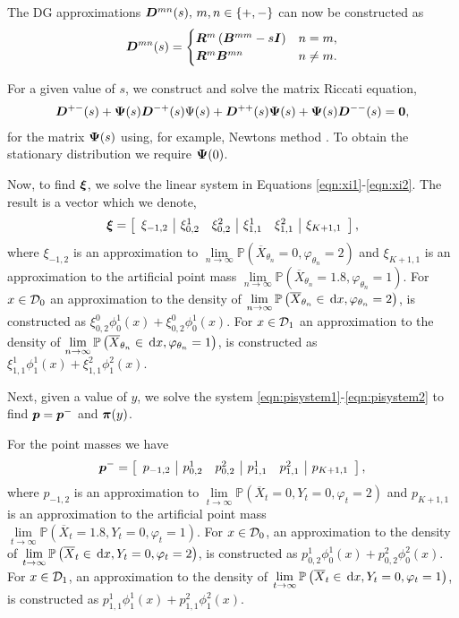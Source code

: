 The DG approximations \(  \boldsymbol D^{m n}(s),\, m,n\in\{+,-\}\) can now be constructed as 
\[  \boldsymbol D^{m n}(s) = \begin{cases}   \boldsymbol R^m\left({  \boldsymbol B}^{mm} - s \boldsymbol I\right) & n=m,
	\\   \boldsymbol R^m {  \boldsymbol B}^{mn} & n \neq m. \end{cases}\]

For a given value of \(s\), we construct and solve the matrix Riccati equation,
\begin{align*}
	\boldsymbol D^{+-}(s)
+ \boldsymbol \Psi(s)   \boldsymbol D^{-+}(s)\Psi(s)
+   \boldsymbol D^{++}(s)\boldsymbol \Psi(s)
+ \boldsymbol \Psi(s)  \boldsymbol D^{--}(s)
= \boldsymbol 0,
\end{align*}
for the matrix \(\boldsymbol \Psi(s)\) using, for example, Newtons method \citep{bot08}. To obtain the stationary distribution we require \(\boldsymbol \Psi(0)\). 

Now, to find \( {\boldsymbol\xi}\), we solve the linear system in Equations \eqref{eqn:xi1}-\eqref{eqn:xi2}. The result is a vector which we denote, 
\[ {\boldsymbol\xi} = \left[\begin{array}{c|cc|cc|c} {\xi}_{-1,2} &  {\xi}_{0,2}^1 &  {\xi}_{0,2}^2 &  {\xi}_{1,1}^1 &  {\xi}_{1,1}^2 &  {\xi}_{K+1,1} \end{array}\right],\]
where \( {\xi}_{-1,2}\) is an approximation to \( \lim\limits_{n\to\infty}\mathbb{P}\left(\overline X_{\theta_n} =0, \varphi_{\theta_n} = 2\right)\) and \( {\xi}_{K+1,1}\) is an approximation to the artificial point mass \( \lim\limits_{n\to\infty}\mathbb{P}\left(\overline X_{\theta_n} =1.8, \varphi_{\theta_n} = 1\right)\). For \(x\in\mathcal{D}_0\) an approximation to the density of \( \lim\limits_{n\to\infty}\mathbb{P}\left(\overline X_{\theta_n} \in \, \mathrm{d} x, \varphi_{\theta_n} = 2\right)\), is constructed as \( {\xi}_{0,2}^0\phi_0^1(x) +  {\xi}_{0,2}^0\phi_0^1(x)\). For \(x\in\mathcal{D}_1\) an approximation to the density of \( \lim\limits_{n\to\infty}\mathbb{P}\left(\overline X_{\theta_n} \in \, \mathrm{d} x, \varphi_{\theta_n} = 1\right)\), is constructed as \( {\xi}_{1,1}^1\phi_1^1(x) +  {\xi}_{1,1}^2\phi_1^2(x).\)

Next, given a value of \(y\), we solve the system \eqref{eqn:pisystem1}-\eqref{eqn:pisystem2} to find \( {\boldsymbol p}= {\boldsymbol p}^-\) and \( {\boldsymbol \pi}(y)\). 

For the point masses we have 
\[ {\boldsymbol p}^- = \left[\begin{array}{c|cc|cc|c} {p}_{-1,2} &  {p}_{0,2}^1 &  {p}_{0,2}^2 &  {p}_{1,1}^1 &  {p}_{1,1}^2 &  {p}_{K+1,1} \end{array}\right],\]
where \( {p}_{-1,2}\) is an approximation to \( \lim\limits_{t\to\infty}\mathbb{P}\left(\overline X_{t} =0, Y_t=0, \varphi_{t} = 2\right)\) and \( {p}_{K+1,1}\) is an approximation to the artificial point mass \( \lim\limits_{t\to\infty}\mathbb{P}\left(\overline X_t =1.8, Y_t=0, \varphi_{t} = 1\right)\). For \(x\in\mathcal{D}_0\), an approximation to the density of \( \lim\limits_{t\to\infty}\mathbb{P}\left(\overline X_t \in \, \mathrm{d} x, Y_t = 0, \varphi_{t} = 2\right)\), is constructed as \( {p}_{0,2}^1\phi_0^1(x) +  {p}_{0,2}^2\phi_0^2(x)\). For \(x\in\mathcal{D}_1\), an approximation to the density of \( \lim\limits_{t\to\infty}\mathbb{P}\left(\overline X_t \in \, \mathrm{d} x, Y_t = 0, \varphi_{t} = 1\right)\), is constructed as \( {p}_{1,1}^1\phi_1^1(x) +  {p}_{1,1}^2\phi_1^2(x).\)

